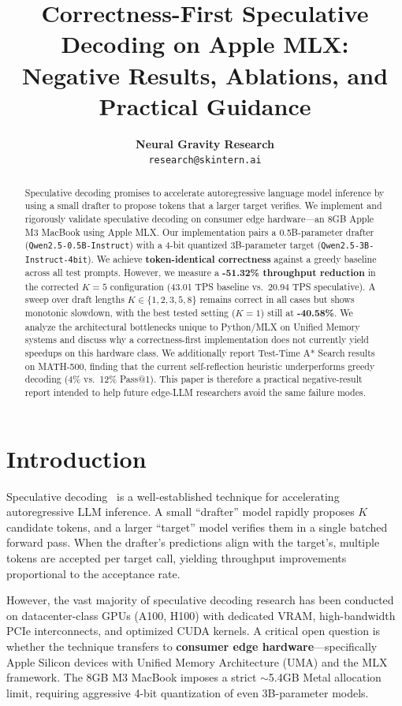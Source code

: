 \documentclass[11pt]{article}
\title{\vspace{-1.5cm}\textbf{Correctness-First Speculative Decoding on Apple MLX: \\Negative Results, Ablations, and Practical Guidance}}
\author{
  \textbf{Neural Gravity Research} \\
  \texttt{research@skintern.ai}
}
\date{}
\begin{document}
\maketitle

\begin{abstract}
Speculative decoding promises to accelerate autoregressive language model inference by using a small drafter to propose tokens that a larger target verifies. We implement and rigorously validate speculative decoding on consumer edge hardware---an 8GB Apple M3 MacBook using Apple MLX. Our implementation pairs a 0.5B-parameter drafter (\texttt{Qwen2.5-0.5B-Instruct}) with a 4-bit quantized 3B-parameter target (\texttt{Qwen2.5-3B-Instruct-4bit}). We achieve \textbf{token-identical correctness} against a greedy baseline across all test prompts. However, we measure a \textbf{-51.32\% throughput reduction} in the corrected $K=5$ configuration (43.01 TPS baseline vs.\ 20.94 TPS speculative). A sweep over draft lengths $K \in \{1,2,3,5,8\}$ remains correct in all cases but shows monotonic slowdown, with the best tested setting ($K=1$) still at \textbf{-40.58\%}. We analyze the architectural bottlenecks unique to Python/MLX on Unified Memory systems and discuss why a correctness-first implementation does not currently yield speedups on this hardware class. We additionally report Test-Time A* Search results on MATH-500, finding that the current self-reflection heuristic underperforms greedy decoding (4\% vs.\ 12\% Pass@1). This paper is therefore a practical negative-result report intended to help future edge-LLM researchers avoid the same failure modes.
\end{abstract}

\section{Introduction}

Speculative decoding~\cite{leviathan2023fast,chen2023accelerating} is a well-established technique for accelerating autoregressive LLM inference. A small ``drafter'' model rapidly proposes $K$ candidate tokens, and a larger ``target'' model verifies them in a single batched forward pass. When the drafter's predictions align with the target's, multiple tokens are accepted per target call, yielding throughput improvements proportional to the acceptance rate.

However, the vast majority of speculative decoding research has been conducted on datacenter-class GPUs (A100, H100) with dedicated VRAM, high-bandwidth PCIe interconnects, and optimized CUDA kernels. A critical open question is whether the technique transfers to \textbf{consumer edge hardware}---specifically Apple Silicon devices with Unified Memory Architecture (UMA) and the MLX framework. The 8GB M3 MacBook imposes a strict $\sim$5.4GB Metal allocation limit, requiring aggressive 4-bit quantization of even 3B-parameter models.
\end{document}
